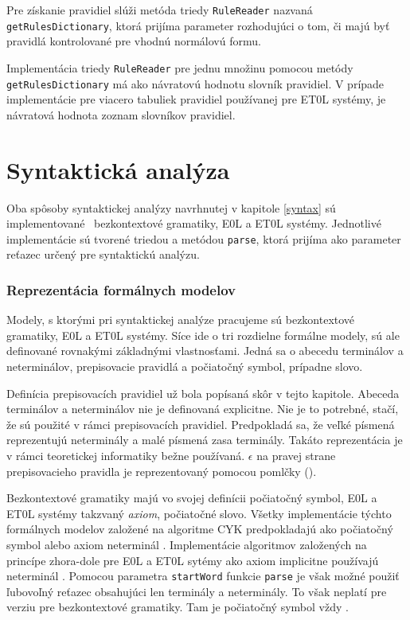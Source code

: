 Pre získanie pravidiel slúži metóda triedy \texttt{RuleReader} nazvaná \texttt{getRulesDictionary}, ktorá prijíma parameter rozhodujúci o tom, či majú byť pravidlá kontrolované pre vhodnú normálovú formu.

Implementácia triedy \texttt{RuleReader} pre jednu množinu pomocou metódy \texttt{getRulesDictionary} má ako návratovú hodnotu slovník pravidiel. V prípade implementácie pre viacero tabuliek pravidiel používanej pre ET0L systémy, je návratová hodnota zoznam slovníkov pravidiel.

\section{Syntaktická analýza}
Oba spôsoby syntaktickej analýzy navrhnutej v kapitole \ref{syntax} sú implementované ~bezkontextové gramatiky, E0L a ET0L systémy. Jednotlivé implementácie sú tvorené triedou a metódou \texttt{parse}, ktorá prijíma ako parameter reťazec určený pre syntaktickú analýzu.

\subsubsection*{Reprezentácia formálnych modelov}
Modely, s ktorými pri syntaktickej analýze pracujeme sú bezkontextové gramatiky, E0L a ET0L systémy. Síce ide o tri rozdielne formálne modely, sú ale definované rovnakými základnými vlastnosťami. Jedná sa o abecedu terminálov a neterminálov, prepisovacie pravidlá a počiatočný symbol, prípadne slovo.

Definícia prepisovacích pravidiel už bola popísaná skôr v tejto kapitole. Abeceda terminálov a neterminálov nie je definovaná explicitne. Nie je to potrebné, stačí, že sú použité v rámci prepisovacích pravidiel. Predpokladá sa, že veľké písmená reprezentujú neterminály a malé písmená zasa terminály. Takáto reprezentácia je v rámci teoretickej informatiky bežne používaná. $\epsilon$ na pravej strane prepisovacieho pravidla je reprezentovaný pomocou pomlčky (\uv{-}).

Bezkontextové gramatiky majú vo svojej definícii počiatočný symbol, E0L a ET0L systémy takzvaný \textit{axiom}, počiatočné slovo. Všetky implementácie týchto formálnych modelov založené na algoritme CYK predpokladajú ako počiatočný symbol alebo axiom neterminál . Implementácie algoritmov založených na princípe zhora-dole pre E0L a ET0L sytémy ako axiom implicitne používajú neterminál . Pomocou parametra \texttt{startWord} funkcie \texttt{parse} je však možné použiť ľubovoľný reťazec obsahujúci len terminály a neterminály. To však neplatí pre verziu pre bezkontextové gramatiky. Tam je počiatočný symbol vždy .


